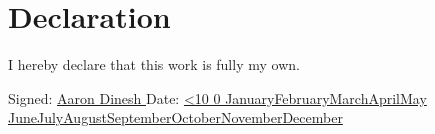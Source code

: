 \documentclass[a4paper,oneside,12pt]{book}
\title{\thesistitle}
\author{\authorname}
\numberwithin{equation}{chapter} %
\renewcommand{\today}{\ifnum\number\day<10 0\fi \number\day \space%
\ifcase \month \or January\or February\or March\or April\or May%
\or June\or July\or August\or September\or October\or November\or December\fi \space%
\number \year}
\begin{document}

\section*{\Huge\textcolor{epfl_red}{Declaration}}
I hereby declare that this work is fully my own.
\vspace{1cm}

Signed: \uline{\hfill Aaron Dinesh \hfill} Date: \uline{\hfill \today \hfill}

\newpage

\end{document}
